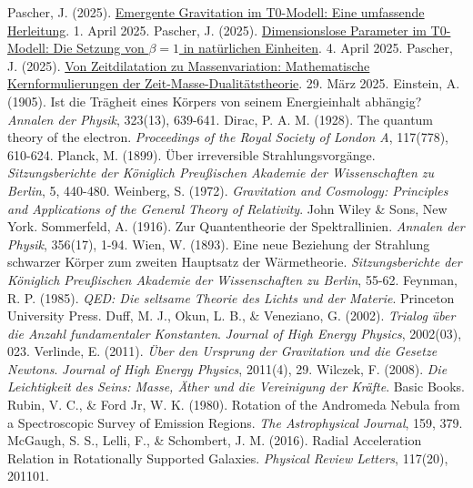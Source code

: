 \documentclass[12pt,a4paper]{article}
\begin{document}
\begin{thebibliography}{99}
		 Pascher, J. (2025). \href{https://github.com/jpascher/T0-Time-Mass-Duality/tree/main/2/pdf/Deutsch/EmergentGravT0.pdf}{Emergente Gravitation im T0-Modell: Eine umfassende Herleitung}. 1. April 2025.
		 Pascher, J. (2025). \href{https://github.com/jpascher/T0-Time-Mass-Duality/tree/main/2/pdf/Deutsch/Alpha1Beta1Konsistenz.pdf}{Dimensionslose Parameter im T0-Modell: Die Setzung von \(\beta = 1\) in natürlichen Einheiten}. 4. April 2025.
		 Pascher, J. (2025). \href{https://github.com/jpascher/T0-Time-Mass-Duality/tree/main/2/pdf/Deutsch/MathZeitMasseLagrange.pdf}{Von Zeitdilatation zu Massenvariation: Mathematische Kernformulierungen der Zeit-Masse-Dualitätstheorie}. 29. März 2025.
		 Einstein, A. (1905). Ist die Trägheit eines Körpers von seinem Energieinhalt abhängig? \textit{Annalen der Physik}, 323(13), 639-641.
		 Dirac, P. A. M. (1928). The quantum theory of the electron. \textit{Proceedings of the Royal Society of London A}, 117(778), 610-624.
		 Planck, M. (1899). Über irreversible Strahlungsvorgänge. \textit{Sitzungsberichte der Königlich Preußischen Akademie der Wissenschaften zu Berlin}, 5, 440-480.
		 Weinberg, S. (1972). \textit{Gravitation and Cosmology: Principles and Applications of the General Theory of Relativity}. John Wiley \& Sons, New York.
		 Sommerfeld, A. (1916). Zur Quantentheorie der Spektrallinien. \textit{Annalen der Physik}, 356(17), 1-94.
		 Wien, W. (1893). Eine neue Beziehung der Strahlung schwarzer Körper zum zweiten Hauptsatz der Wärmetheorie. \textit{Sitzungsberichte der Königlich Preußischen Akademie der Wissenschaften zu Berlin}, 55-62.
		 Feynman, R. P. (1985). \textit{QED: Die seltsame Theorie des Lichts und der Materie}. Princeton University Press.
		 Duff, M. J., Okun, L. B., \& Veneziano, G. (2002). \textit{Trialog über die Anzahl fundamentaler Konstanten}. \textit{Journal of High Energy Physics}, 2002(03), 023.
		 Verlinde, E. (2011). \textit{Über den Ursprung der Gravitation und die Gesetze Newtons}. \textit{Journal of High Energy Physics}, 2011(4), 29.
		 Wilczek, F. (2008). \textit{Die Leichtigkeit des Seins: Masse, Äther und die Vereinigung der Kräfte}. Basic Books.
		 Rubin, V. C., \& Ford Jr, W. K. (1980). Rotation of the Andromeda Nebula from a Spectroscopic Survey of Emission Regions. \textit{The Astrophysical Journal}, 159, 379.
		 McGaugh, S. S., Lelli, F., \& Schombert, J. M. (2016). Radial Acceleration Relation in Rotationally Supported Galaxies. \textit{Physical Review Letters}, 117(20), 201101.
	\end{thebibliography}
	
\end{document}
